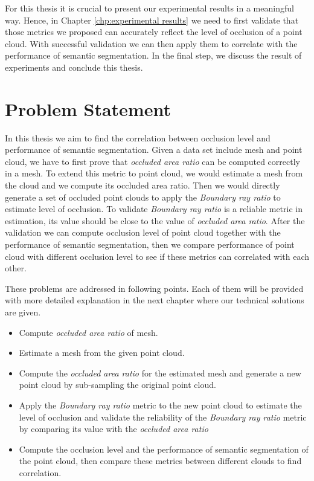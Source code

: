 \documentclass[11pt, a4paper,oneside,chapterprefix=false]{scrbook}
\begin{document}
\vspace{10pt}

For this thesis it is crucial to present our experimental results in a meaningful way. Hence, in Chapter \ref{chp:experimental results} we need to first validate that those metrics we proposed can accurately reflect the level of occlusion of a point cloud. With successful validation we can then apply them to correlate with the performance of semantic segmentation. In the final step, we discuss the result of experiments and conclude this thesis.


\chapter{Problem Statement} \label{chp:problem}

In this thesis we aim to find the correlation between occlusion level and performance of semantic segmentation. Given a data set include mesh and point cloud, we have to first prove that \emph{occluded area ratio} can be computed correctly in a mesh. To extend this metric to point cloud, we would estimate a mesh from the cloud and we compute its occluded area ratio. Then we would directly generate a set of occluded point clouds to apply the \emph{Boundary ray ratio} to estimate level of occlusion. To validate \emph{Boundary ray ratio} is a reliable metric in estimation, its value should be close to the value of \emph{occluded area ratio}. After the validation we can compute occlusion level of point cloud together with the performance of semantic segmentation, then we compare performance of point cloud with different occlusion level to see if these metrics can correlated with each other.

\vspace{10pt}

These problems are addressed in following points. Each of them will be provided with more detailed explanation in the next chapter where our technical solutions are given.

\begin{itemize}
    \item Compute \emph{occluded area ratio} of mesh.
    \item Estimate a mesh from the given point cloud.
    \item Compute the \emph{occluded area ratio} for the estimated mesh and generate a new point cloud by sub-sampling the original point cloud.
    \item Apply the \emph{Boundary ray ratio} metric to the new point cloud to estimate the level of occlusion and validate the reliability of the \emph{Boundary ray ratio} metric by comparing its value with the \emph{occluded area ratio}
    \item Compute the occlusion level and the performance of semantic segmentation of the point cloud, then compare these metrics between different clouds to find correlation. 
\end{itemize}
\end{document}
